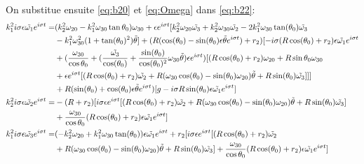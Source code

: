 On substitue ensuite \ref{eq:b20} et \ref{eq:Omega} dans \ref{eq:b22}:
\begin{align}
    k_1^2 i \sigma \epsilon \Tilde{\omega_1} e^{i \sigma t} =&(k_2^2\omega_{20}-k_1^2\omega_{30} \tan{\theta_0})\omega_{30}+\epsilon e^{i\sigma t}[k_2^2 \omega_{20} \tilde{\omega_3}+k_2^2 \omega_{30} \tilde{\omega_2} -2k_1^2\omega_{30} \tan(\theta_0)\tilde{\omega_3}\nonumber\\
    &-k_1^2 \omega_{30}^2(1+\tan(\theta_0)^2)\tilde{\theta} ]+(R(\cos(\theta_0)- \sin(\theta_0)\epsilon \Tilde{\theta} e^{i \sigma t})+r_2)[-i \sigma( R\cos(\theta_0)+r_2)\epsilon \Tilde{\omega_1} e^{i \sigma t} \nonumber\\
    &+ (\frac{\omega_{30}}{\cos{\theta_0}} + (\frac{\tilde{\omega_3}}{\cos(\theta_0)}+\frac{\sin(\theta_0)}{\cos(\theta_0)^2}\omega_{30}\tilde{\theta})\epsilon e^{i \sigma t}) [(R\cos(\theta_0)+r_2)\omega_{20}+R \sin{\theta_0}\omega_{30} \nonumber\\ 
    &+ \epsilon e^{i \sigma t}[(R\cos(\theta_0)+r_2) \Tilde{\omega_2} +R(\omega_{30}\cos(\theta_0)-\sin(\theta_0)\omega_{20}) \Tilde{\theta}+R\sin(\theta_0) \Tilde{\omega_3} ] ]] \nonumber\\
    &+ R(\sin(\theta_0)+ \cos(\theta_0)\epsilon \Tilde{\theta} e^{i \sigma t})[g-i \sigma R \sin(\theta_0)\epsilon \Tilde{\omega_1} e^{i \sigma t}] \nonumber\\
    k_2^2 i \sigma\epsilon \Tilde{\omega_2} e^{i \sigma t}=&-(R+r_2) [i \sigma \epsilon e^{i \sigma t}[(R\cos(\theta_0)+r_2) \Tilde{\omega_2} +R(\omega_{30}\cos(\theta_0)-\sin(\theta_0)\omega_{20}) \Tilde{\theta}+R\sin(\theta_0) \Tilde{\omega_3} ] \nonumber\\
    &+\frac{\omega_{30}}{\cos{\theta_0}} (R\cos(\theta_0)+r_2)\epsilon \Tilde{\omega_1} e^{i \sigma t}] \nonumber\\
    k_1^2 i \sigma\epsilon \Tilde{\omega_3} e^{i \sigma t}=&(-k_2^2\omega_{20}+k_1^2\omega_{30} \tan(\theta_0))\epsilon \Tilde{\omega_1} e^{i \sigma t} + r_2 [i \sigma \epsilon e^{i \sigma t}[(R\cos(\theta_0)+r_2) \Tilde{\omega_2} \nonumber\\
    &+R(\omega_{30}\cos(\theta_0)-\sin(\theta_0)\omega_{20}) \Tilde{\theta}+R\sin(\theta_0) \Tilde{\omega_3} ] 
    +\frac{\omega_{30}}{\cos{\theta_0}} (R\cos(\theta_0)+r_2)\epsilon \Tilde{\omega_1} e^{i \sigma t}]
\label{eq:b23}
\end{align}

